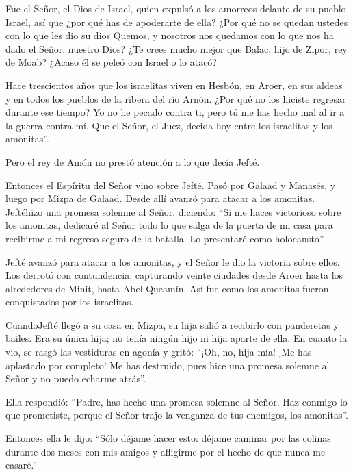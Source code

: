  Fue el Señor, el Dios de Israel, quien expulsó a los
amorreos delante de su pueblo Israel, así que ¿por qué has de apoderarte
de ella?  ¿Por qué no se quedan ustedes con lo que les dio
su dios Quemos, y nosotros nos quedamos con lo que nos ha dado el Señor,
nuestro Dios?  ¿Te crees mucho mejor que Balac, hijo de
Zipor, rey de Moab? ¿Acaso él se peleó con Israel o lo atacó?

 Hace trescientos años que los israelitas viven en Hesbón,
en Aroer, en sus aldeas y en todos los pueblos de la ribera del río
Arnón. ¿Por qué no los hiciste regresar durante ese tiempo?
 Yo no he pecado contra ti, pero tú me has hecho mal al ir
a la guerra contra mí. Que el Señor, el Juez, decida hoy entre los
israelitas y los amonitas''.

 Pero el rey de Amón no prestó atención a lo que decía
Jefté.

 Entonces el Espíritu del Señor vino sobre Jefté. Pasó por
Galaad y Manasés, y luego por Mizpa de Galaad. Desde allí avanzó para
atacar a los amonitas.  Jeftéhizo una promesa solemne al
Señor, diciendo: ``Si me haces victorioso sobre los amonitas,
 dedicaré al Señor todo lo que salga de la puerta de mi
casa para recibirme a mi regreso seguro de la batalla. Lo presentaré
como holocausto''.

 Jefté avanzó para atacar a los amonitas, y el Señor le dio
la victoria sobre ellos.  Los derrotó con contundencia,
capturando veinte ciudades desde Aroer hasta los alrededores de Minit,
hasta Abel-Queamín. Así fue como los amonitas fueron conquistados por
los israelitas.

 CuandoJefté llegó a su casa en Mizpa, su hija salió a
recibirlo con panderetas y bailes. Era su única hija; no tenía ningún
hijo ni hija aparte de ella.  En cuanto la vio, se rasgó
las vestiduras en agonía y gritó: ``¡Oh, no, hija mía! ¡Me has aplastado
por completo! Me has destruido, pues hice una promesa solemne al Señor y
no puedo echarme atrás''.

 Ella respondió: ``Padre, has hecho una promesa solemne al
Señor. Haz conmigo lo que prometiste, porque el Señor trajo la venganza
de tus enemigos, los amonitas''.

 Entonces ella le dijo: ``Sólo déjame hacer esto: déjame
caminar por las colinas durante dos meses con mis amigos y afligirme por
el hecho de que nunca me casaré.''

